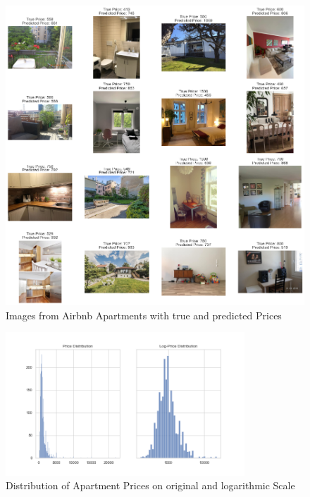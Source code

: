 \documentclass[12pt, letterpaper]{article}
\begin{document}
\begin{figure}[t]
    \centering
    \includegraphics[width=\textwidth]{cnn_examples.png}
    \caption{Images from Airbnb Apartments with true and predicted Prices}
    \label{fig:cnn-examples}
\end{figure}

\begin{figure}[t]
    \centering
    \includegraphics[width=0.8\textwidth]{price_distribution.png}
    \caption{Distribution of Apartment Prices on original and logarithmic Scale}
    \label{fig:price-distribution}
\end{figure}
\end{document}
